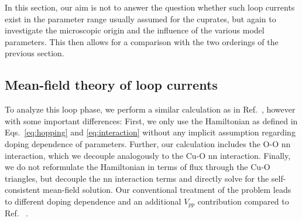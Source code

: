 \documentclass[prb, twocolumn,showpacs,preprintnumbers,amsmath,amssymb, floatfix]{revtex4}
\begin{document}
In this section, our aim is not to answer the question whether such loop currents exist in the parameter range usually assumed for the cuprates, but again to investigate the microscopic origin and the influence of the various model parameters. This then allows for a comparison with the two orderings of the previous section. 

\subsection{Mean-field theory of loop currents}
 To analyze this loop phase, we perform a similar calculation as in
 Ref.~\cite{varma:2006b}, however with some important differences:
 First, we only use the Hamiltonian as defined in
 Eqs.~\eqref{eq:hopping} and \eqref{eq:interaction} without any
 implicit assumption regarding doping dependence of parameters.
 Further, our calculation includes the O-O nn interaction, which we decouple analogously to the Cu-O nn interaction.	   
 Finally, we do not reformulate the Hamiltonian in terms of flux
 through the Cu-O triangles, but decouple the nn interaction terms and
 directly solve for the self-consistent mean-field solution. Our
 conventional treatment of the problem leads to different doping
 dependence and an additional $V_{pp}$ contribution compared to Ref. ~\cite{varma:2006b}.
\end{document}

